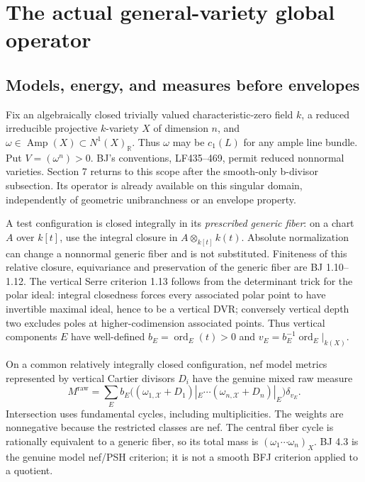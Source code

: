 \documentclass[
  11pt,
]{article}
\begin{document}
\section{The actual general-variety global
operator}\label{the-actual-general-variety-global-operator}

\subsection{Models, energy, and measures before
envelopes}\label{models-energy-and-measures-before-envelopes}

Fix an algebraically closed trivially valued characteristic-zero field
\(k\), a reduced irreducible projective \(k\)-variety \(X\) of dimension
\(n\), and \(\omega\in\operatorname{Amp}(X)\subset N^1(X)_{\mathbb R}\).
Thus \(\omega\) may be \(c_1(L)\) for any ample line bundle. Put
\(V=(\omega^n)>0\). BJ's conventions, LF435--469, permit reduced
nonnormal varieties. Section 7 returns to this scope after the
smooth-only b-divisor subsection. Its operator is already available on
this singular domain, independently of geometric unibranchness or an
envelope property.

A test configuration is closed integrally in its \emph{prescribed
generic fiber}: on a chart \(A\) over \(k[t]\), use the integral closure
in \(A\otimes_{k[t]}k(t)\). Absolute normalization can change a
nonnormal generic fiber and is not substituted. Finiteness of this
relative closure, equivariance and preservation of the generic fiber are
BJ 1.10--1.12. The vertical Serre criterion 1.13 follows from the
determinant trick for the polar ideal: integral closedness forces every
associated polar point to have invertible maximal ideal, hence to be a
vertical DVR; conversely vertical depth two excludes poles at
higher-codimension associated points. Thus vertical components \(E\)
have well-defined \(b_E=\operatorname{ord}_E(t)>0\) and
\(v_E=b_E^{-1}\operatorname{ord}_E|_{k(X)}\).

On a common relatively integrally closed configuration, nef model
metrics represented by vertical Cartier divisors \(D_i\) have the
genuine mixed raw measure \[
 M^{\mathrm{raw}}=\sum_E b_E
       \bigl((\omega_{1,\mathcal X}+D_1)|_E\cdots
             (\omega_{n,\mathcal X}+D_n)|_E\bigr)\delta_{v_E}.             \tag{1}
\] Intersection uses fundamental cycles, including multiplicities. The
weights are nonnegative because the restricted classes are nef. The
central fiber cycle is rationally equivalent to a generic fiber, so its
total mass is \((\omega_1\cdots\omega_n)_X\). BJ 4.3 is the genuine
model nef/PSH criterion; it is not a smooth BFJ criterion applied to a
quotient.
\end{document}
